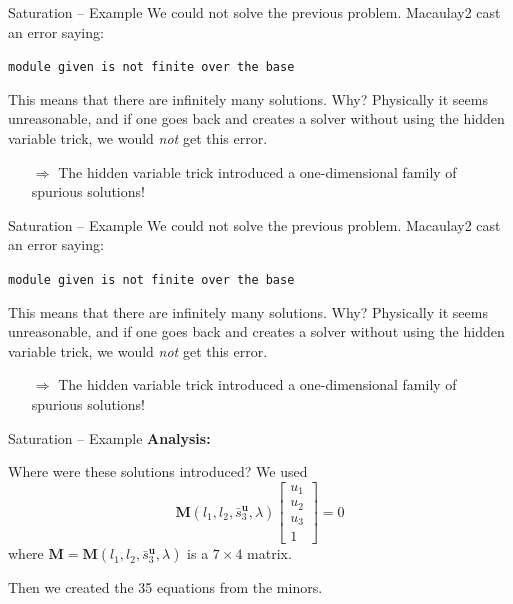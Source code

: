 \documentclass[aspectratio=169]{beamer}
\newcommand{\mat}[1]{\bm{#1}}
\begin{document}
\begin{frame}{Saturation -- Example}
We could not solve the previous problem. Macaulay2 cast an error
saying:
\begin{center}
    \texttt{module given is not finite over the base}
\end{center}

This means that there are infinitely many solutions. Why? Physically it seems unreasonable,
and if one goes back and creates a solver without using the hidden variable trick, we would
\emph{not} get this error.

\begin{itemize}
    \item[$\Rightarrow$] The hidden variable trick introduced a one-dimensional family of
                         spurious solutions!
\end{itemize}
\end{frame}

\begin{frame}{Saturation -- Example}
We could not solve the previous problem. Macaulay2 cast an error
saying:
\begin{center}
    \texttt{module given is not finite over the base}
\end{center}

This means that there are infinitely many solutions. Why? Physically it seems unreasonable,
and if one goes back and creates a solver without using the hidden variable trick, we would
\emph{not} get this error.

\begin{itemize}
    \item[$\Rightarrow$] The hidden variable trick introduced a one-dimensional family of
                         spurious solutions!
\end{itemize}
\end{frame}

\begin{frame}{Saturation -- Example}
\textbf{Analysis:}

Where were these solutions introduced?
We used
\begin{equation*}
\mat{M}(l_1,l_2,\bar{s}_3^{\mat{u}},\lambda)\begin{bmatrix} u_1 \\ u_2 \\ u_3 \\1\end{bmatrix} = 0
\end{equation*}
where $\mat{M} = \mat{M}(l_1,l_2,\bar{s}_3^{\mat{u}},\lambda)$ is a $7\times 4$ matrix.

Then we created the 35 equations from the minors.

\end{frame}
\end{document}
